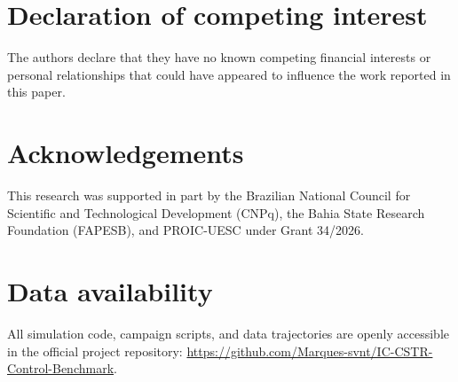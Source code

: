 \documentclass[a4paper,fleqn]{cas-dc}
\begin{document}
\section*{Declaration of competing interest}
The authors declare that they have no known competing financial interests or personal relationships that could have appeared to influence the work reported in this paper.

\section*{Acknowledgements}
This research was supported in part by the Brazilian National Council for Scientific and Technological Development (CNPq), the Bahia State Research Foundation (FAPESB), and PROIC-UESC under Grant 34/2026.

\section*{Data availability}
{\sloppy All simulation code, campaign scripts, and data trajectories are openly accessible in the official project repository: \url{https://github.com/Marques-svnt/IC-CSTR-Control-Benchmark}.\par}



\end{document}
